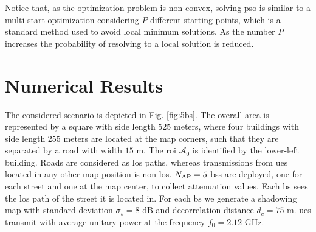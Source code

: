 \documentclass[conference,final]{IEEEtran}
\begin{document}


      
    

Notice that, as the optimization problem is non-convex, solving \ac{pso} is similar to a multi-start optimization considering $P$ different starting points, which is a standard method used to avoid local minimum solutions. As the number $P$ increases the probability of resolving to a local solution is reduced.

\section{Numerical Results}\label{sec: nr}

The considered scenario is depicted in Fig. \ref{fig:5bs}. The overall area is represented by a square with side length $525$ meters, where four buildings with side length $255$ meters are located at the map corners, such that they are separated by a road with width $15$ m. The \ac{roi} $\mathcal{A}_0$ is identified by the lower-left building. Roads are considered as \ac{los} paths, whereas transmissions from \acp{ue} located in any other map position is non-\ac{los}. $N_{\rm AP}=5$ \acp{bs} are deployed, one for each street and one at the map center, to collect attenuation values. Each \ac{bs} sees the \ac{los} path of the street it is located in. For each \ac{bs} we generate a shadowing map with standard deviation $\sigma_s = 8$ dB and decorrelation distance $d_c = 75$ m. \acp{ue} transmit with average unitary power at the frequency $f_0 = 2.12$ GHz.
\end{document}
